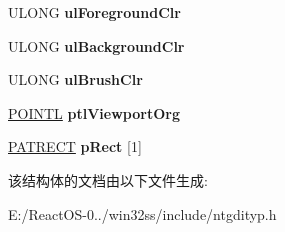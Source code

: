 \begin{DoxyCompactItemize}
U\+L\+O\+NG {\bfseries ul\+Foreground\+Clr}
\item 
\mbox{\label{struct___g_d_i_b_s_p_p_a_t_b_l_t_a4cf7e1cd014ca68b2cd8f677269e0163}} 
U\+L\+O\+NG {\bfseries ul\+Background\+Clr}
\item 
\mbox{\label{struct___g_d_i_b_s_p_p_a_t_b_l_t_a6150947818eba790e23c20108dc46e91}} 
U\+L\+O\+NG {\bfseries ul\+Brush\+Clr}
\item 
\mbox{\label{struct___g_d_i_b_s_p_p_a_t_b_l_t_add337295d1635bbbeff1d6c128938797}} 
\hyperlink{struct___p_o_i_n_t_l}{P\+O\+I\+N\+TL} {\bfseries ptl\+Viewport\+Org}
\item 
\mbox{\label{struct___g_d_i_b_s_p_p_a_t_b_l_t_a668821dceeace9b0e341aef236d3746a}} 
\hyperlink{struct___p_a_t_r_e_c_t}{P\+A\+T\+R\+E\+CT} {\bfseries p\+Rect} \mbox{[}1\mbox{]}
\end{DoxyCompactItemize}


该结构体的文档由以下文件生成\+:\begin{DoxyCompactItemize}
\item 
E\+:/\+React\+O\+S-\/0../win32ss/include/ntgdityp.\+h\end{DoxyCompactItemize}
